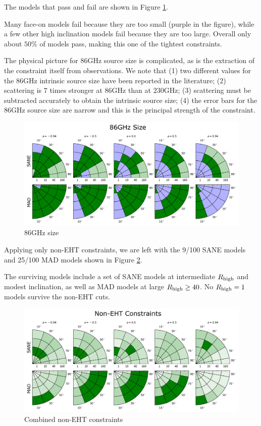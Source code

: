 The models that pass and fail are shown in Figure \ref{fig:cmp_86ghz_size}.

Many face-on models fail because they are too small (purple in the figure), while a few other high inclination models fail because they are too large.  Overall only about $50\%$ of models pass, making this one of the tightest constraints.

The physical picture for 86GHz source size is complicated, as is the extraction of the constraint itself from observations.  We note that (1) two different values for the 86GHz intrinsic source size have been reported in the literature; (2) scattering is $7$ times stronger at $86$GHz than at $230$GHz; (3) scattering must be subtracted accurately to obtain the intrinsic source size; (4) the error bars for the 86GHz source size are narrow and this is the principal strength of the constraint.

\begin{figure}
  \centering
  \includegraphics[width=\columnwidth]{./figures/86GHz_size_Constraints.png}
  \caption{86GHz size}
  \label{fig:cmp_86ghz_size}
\end{figure}



Applying only non-EHT constraints, we are left with the 9/100 SANE models and 25/100 MAD models shown in Figure \ref{fig:non_eht_cuts}.

The surviving models include a set of SANE models at intermediate $R_\mathrm{high}$ and modest inclination, as well as MAD models at large $R_\mathrm{high} \ge 40$.  No $R_\mathrm{high} = 1$ models survive the non-EHT cuts.


\begin{figure}
  \centering
  \includegraphics[width=\columnwidth]{./figures/Non_Interferometric_Constraints.png}
  \caption{Combined non-EHT constraints}
  \label{fig:non_eht_cuts}
\end{figure}

